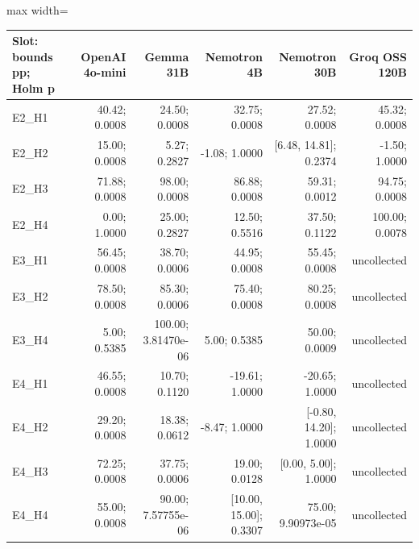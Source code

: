 \documentclass[11pt,a4paper]{article}
\begin{document}
\begin{center}\begingroup\small\setlength{\tabcolsep}{4.5pt}\renewcommand{\arraystretch}{1.12}\begin{adjustbox}{max width=\textwidth}\begin{tabular}{lrrrrr}\toprule
\textbf{Slot: bounds pp; Holm p} & \textbf{OpenAI 4o-mini} & \textbf{Gemma 31B} & \textbf{Nemotron 4B} & \textbf{Nemotron 30B} & \textbf{Groq OSS 120B} \\ \midrule
E2\_\allowbreak{}H1 & 40.42; 0.0008 & 24.50; 0.0008 & 32.75; 0.0008 & 27.52; 0.0008 & 45.32; 0.0008 \\
E2\_\allowbreak{}H2 & 15.00; 0.0008 & 5.27; 0.2827 & -1.08; 1.0000 & [6.48, 14.81]; 0.2374 & -1.50; 1.0000 \\
E2\_\allowbreak{}H3 & 71.88; 0.0008 & 98.00; 0.0008 & 86.88; 0.0008 & 59.31; 0.0012 & 94.75; 0.0008 \\
E2\_\allowbreak{}H4 & 0.00; 1.0000 & 25.00; 0.2827 & 12.50; 0.5516 & 37.50; 0.1122 & 100.00; 0.0078 \\
E3\_\allowbreak{}H1 & 56.45; 0.0008 & 38.70; 0.0006 & 44.95; 0.0008 & 55.45; 0.0008 & uncollected \\
E3\_\allowbreak{}H2 & 78.50; 0.0008 & 85.30; 0.0006 & 75.40; 0.0008 & 80.25; 0.0008 & uncollected \\
E3\_\allowbreak{}H4 & 5.00; 0.5385 & 100.00; 3.81470e-06 & 5.00; 0.5385 & 50.00; 0.0009 & uncollected \\
E4\_\allowbreak{}H1 & 46.55; 0.0008 & 10.70; 0.1120 & -19.61; 1.0000 & -20.65; 1.0000 & uncollected \\
E4\_\allowbreak{}H2 & 29.20; 0.0008 & 18.38; 0.0612 & -8.47; 1.0000 & [-0.80, 14.20]; 1.0000 & uncollected \\
E4\_\allowbreak{}H3 & 72.25; 0.0008 & 37.75; 0.0006 & 19.00; 0.0128 & [0.00, 5.00]; 1.0000 & uncollected \\
E4\_\allowbreak{}H4 & 55.00; 0.0008 & 90.00; 7.57755e-06 & [10.00, 15.00]; 0.3307 & 75.00; 9.90973e-05 & uncollected \\
\bottomrule\end{tabular}\end{adjustbox}\endgroup\end{center}
\end{document}
